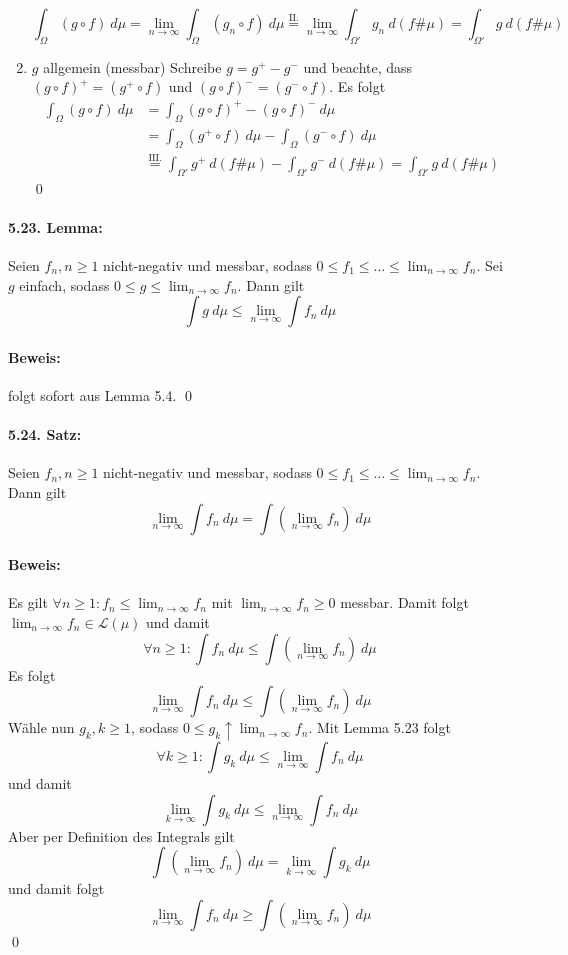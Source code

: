 \begin{enumerate}[label=\Roman*.]
     $$\int_\Omega (g\circ f)\ d\mu=\lim_{n\to\infty}\int_\Omega(g_n\circ f)\ d\mu\overset{\text{II.}}{=}\lim_{n\to\infty}\int_{\Omega'}g_n\ d(f\#\mu)=\int_{\Omega'}g\ d(f\#\mu)$$
     \item $g$ allgemein (messbar)\newline
     Schreibe $g=g^+-g^-$ und beachte, dass $(g\circ f)^+=(g^+\circ f)$ und $(g\circ f)^-=(g^-\circ f)$. Es folgt
     \begin{align*}
         \int_\Omega(g\circ f)\ d\mu&=\int_\Omega(g\circ f)^+-(g\circ f)^-\ d\mu\\
         &=\int_\Omega(g^+\circ f)\ d \mu-\int_\Omega(g^-\circ f)\ d\mu\\
         &\overset{\text{III.}}{=}\int_{\Omega'} g^+\ d(f\#\mu)-\int_{\Omega'}g^-\ d(f\#\mu)
         =\int_{\Omega'}g\ d(f\#\mu)
     \end{align*}
     \qed
 \end{enumerate}
 
 \paragraph{5.23. Lemma:}Seien $f_n,n\geq1$ nicht-negativ und messbar, sodass $0\leq f_1\leq\hdots\leq\displaystyle\lim_{n\to\infty}f_n$. Sei $g$ einfach, sodass $0\leq g\leq\displaystyle\lim_{n\to\infty}f_n$. Dann gilt
 $$\int g\ d\mu\leq\lim_{n\to\infty}\int f_n\ d\mu$$
 
 \paragraph{Beweis:} folgt sofort aus Lemma 5.4. \qed
 
 \paragraph{5.24. Satz:}Seien $f_n,n\geq1$ nicht-negativ und messbar, sodass $0\leq f_1\leq\hdots\leq\displaystyle\lim_{n\to\infty}f_n$. Dann gilt 
 $$\lim_{n\to\infty}\int f_n\ d\mu=\int \left(\lim_{n\to\infty} f_n\right)\ d\mu$$
 
 \paragraph{Beweis:}Es gilt $\forall n\geq1:f_n\leq\displaystyle\lim_{n\to\infty}f_n$ mit $\displaystyle\lim_{n\to\infty}f_n\geq0$ messbar. Damit folgt $\displaystyle\lim_{n\to\infty}f_n\in\mathcal{L}(\mu)$ und damit
 $$\forall n\geq 1:\int f_n\ d\mu\leq\int\left(\lim_{n\to\infty}f_n\right)\ d\mu$$
 Es folgt 
 $$\lim_{n\to\infty}\int f_n\ d\mu\leq\int\left(\lim_{n\to\infty} f_n\right)\ d\mu$$
 W\"ahle nun $g_k,k\geq1$, sodass $\displaystyle0\leq g_k\uparrow \lim_{n\to\infty}f_n$. Mit Lemma 5.23 folgt 
 $$\forall k\geq1:\int g_k\ d\mu\leq\lim_{n\to\infty}\int f_n\ d\mu$$
 und damit 
 $$\lim_{k\to\infty}\int g_k\ d\mu\leq\lim_{n\to\infty}\int f_n\ d\mu$$
 Aber per Definition des Integrals gilt
 $$\int\left(\lim_{n\to\infty}f_n\right)\ d\mu=\lim_{k\to\infty}\int g_k\ d\mu$$
 und damit folgt 
 $$\lim_{n\to\infty}\int f_n\ d\mu\geq\int\left(\lim_{n\to\infty} f_n\right)\ d\mu$$
 \qed
 
